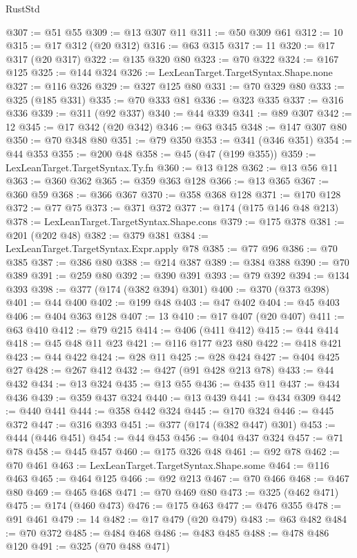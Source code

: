\begin{lexlean}{RustStd}
\begin{coremodule}
@307 := @51 @55
@309 := @13 @307 @11
@311 := @50 @309 @61
@312 := 10
@315 := @17 @312 (@20 @312)
@316 := @63 @315
@317 := 11
@320 := @17 @317 (@20 @317)
@322 := @135 @320 @80
@323 := @70 @322
@324 := @167 @125
@325 := @144 @324
@326 := LexLeanTarget.TargetSyntax.Shape.none
@327 := @116 @326
@329 := @327 @125 @80
@331 := @70 @329 @80
@333 := @325 (@185 @331)
@335 := @70 @333 @81
@336 := @323 @335
@337 := @316 @336
@339 := @311 (@92 @337)
@340 := @44 @339
@341 := @89 @307
@342 := 12
@345 := @17 @342 (@20 @342)
@346 := @63 @345
@348 := @147 @307 @80
@350 := @70 @348 @80
@351 := @79 @350
@353 := @341 (@346 @351)
@354 := @44 @353
@355 := @200 @48
@358 := @45 (@47 (@199 @355))
@359 := LexLeanTarget.TargetSyntax.Ty.fn
@360 := @13 @128
@362 := @13 @56 @11
@363 := @360 @362
@365 := @359 @363 @128
@366 := @13 @365
@367 := @360 @59
@368 := @366 @367
@370 := @358 @368 @128
@371 := @170 @128
@372 := @77 @75
@373 := @371 @372
@377 := @174 (@175 @146 @48 @213)
@378 := LexLeanTarget.TargetSyntax.Shape.cons
@379 := @175 @378
@381 := @201 (@202 @48)
@382 := @379 @381
@384 := LexLeanTarget.TargetSyntax.Expr.apply @78
@385 := @77 @96
@386 := @70 @385
@387 := @386 @80
@388 := @214 @387
@389 := @384 @388
@390 := @70 @389
@391 := @259 @80
@392 := @390 @391
@393 := @79 @392
@394 := @134 @393
@398 := @377 (@174 (@382 @394) @301)
@400 := @370 (@373 @398)
@401 := @44 @400
@402 := @199 @48
@403 := @47 @402
@404 := @45 @403
@406 := @404 @363 @128
@407 := 13
@410 := @17 @407 (@20 @407)
@411 := @63 @410
@412 := @79 @215
@414 := @406 (@411 @412)
@415 := @44 @414
@418 := @45 @48 @11 @23
@421 := @116 @177 @23 @80
@422 := @418 @421
@423 := @44 @422
@424 := @28 @11
@425 := @28 @424
@427 := @404 @425 @27
@428 := @267 @412
@432 := @427 (@91 @428 @213 @78)
@433 := @44 @432
@434 := @13 @324
@435 := @13 @55
@436 := @435 @11
@437 := @434 @436
@439 := @359 @437 @324
@440 := @13 @439
@441 := @434 @309
@442 := @440 @441
@444 := @358 @442 @324
@445 := @170 @324
@446 := @445 @372
@447 := @316 @393
@451 := @377 (@174 (@382 @447) @301)
@453 := @444 (@446 @451)
@454 := @44 @453
@456 := @404 @437 @324
@457 := @71 @78
@458 := @445 @457
@460 := @175 @326 @48
@461 := @92 @78
@462 := @70 @461
@463 := LexLeanTarget.TargetSyntax.Shape.some
@464 := @116 @463
@465 := @464 @125
@466 := @92 @213
@467 := @70 @466
@468 := @467 @80
@469 := @465 @468
@471 := @70 @469 @80
@473 := @325 (@462 @471)
@475 := @174 (@460 @473)
@476 := @175 @463
@477 := @476 @355
@478 := @91 @461
@479 := 14
@482 := @17 @479 (@20 @479)
@483 := @63 @482
@484 := @70 @372
@485 := @484 @468
@486 := @483 @485
@488 := @478 @486 @120
@491 := @325 (@70 @488 @471)

\end{coremodule}
\end{lexlean}
